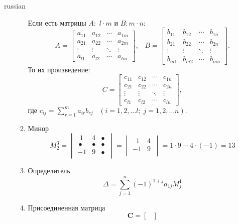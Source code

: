 \documentclass{article}
\begin{document}
\begin{otherlanguage*}{russian}
\begin{enumerate}
\begin{enumerate}
Если есть матрицы $A: \,\, l \cdot m$ и $B: m \cdot n$:
\begin{equation}
{\displaystyle A={\begin{bmatrix}a_{11}&a_{12}&\cdots &a_{1m}\\a_{21}&a_{22}&\cdots &a_{2m}\\\vdots &\vdots &\ddots &\vdots \\a_{l1}&a_{l2}&\cdots &a_{lm}\end{bmatrix}},\;\;\;B={\begin{bmatrix}b_{11}&b_{12}&\cdots &b_{1n}\\b_{21}&b_{22}&\cdots &b_{2n}\\\vdots &\vdots &\ddots &\vdots \\b_{m1}&b_{m2}&\cdots &b_{mn}\end{bmatrix}}.}
\end{equation}
То их произведение: 
\begin{equation}
{\displaystyle C={\begin{bmatrix}c_{11}&c_{12}&\cdots &c_{1n}\\c_{21}&c_{22}&\cdots &c_{2n}\\\vdots &\vdots &\ddots &\vdots \\c_{l1}&c_{l2}&\cdots &c_{ln}\end{bmatrix}},}
\end{equation}
где ${\displaystyle c_{ij}=\sum _{r=1}^{m}a_{ir}b_{rj}\;\;\;\left(i=1,2,\ldots l;\;j=1,2,\ldots n\right).}$
\item Минор
\begin{equation}
M^3_2 = \begin{vmatrix}\,\,1&4&\bullet \,\\\,\bullet &\bullet &\bullet \,\\-1&9&\bullet \,\\\end{vmatrix} = {\displaystyle {\begin{vmatrix}\,\,\,1&4\,\\-1&9\,\\\end{vmatrix}}=1\cdot 9-4\cdot (-1)=13}
\end{equation}
\item Определитель
\begin{equation}
\Delta =\sum _{j=1}^{n}(-1)^{1+j}a_{1j}{M}_{j}^{1}
\end{equation}
\item Присоединенная матрица
\begin{equation}
\mathbf {C} = 
\begin{bmatrix}

\end{bmatrix}
\end{equation}
\end{enumerate}
\end{enumerate}
\end{otherlanguage*}
\end{document}
